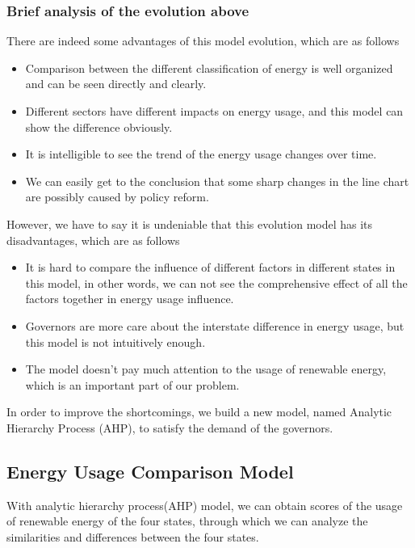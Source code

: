 \documentclass[a4paper,11pt]{article}
\begin{document}
\subsubsection{Brief analysis of the evolution above}
\par There are indeed some advantages of this model evolution, which are as follows
\begin{itemize}
    \item Comparison between the different classification of energy is well organized and can be seen directly and clearly.
    \item Different sectors have different impacts on energy usage, and this model can show the difference obviously.
    \item It is intelligible to see the trend of the energy usage changes over time.
    \item We can easily get to the conclusion that some sharp changes in the line chart are possibly caused by policy reform.  
\end{itemize}
\par However, we have to say it is undeniable that this evolution model has its disadvantages, which are as follows
\begin{itemize}
    \item It is hard to compare the influence of different factors in different states in this model, in other words, we can not see the comprehensive effect of all the factors together in energy usage influence.
    \item Governors are more care about the interstate difference in energy usage, but this model is not intuitively enough.
    \item The model doesn't pay much attention to the usage of renewable energy, which is an important part of our problem.
\end{itemize}
\par In order to improve the shortcomings, we build a new model, named Analytic Hierarchy Process (AHP), to satisfy the demand of the governors.


\subsection{Energy Usage Comparison Model}

\par With analytic hierarchy process(AHP) model, we can obtain scores of the usage of renewable energy of the four states, through which we can analyze the similarities and differences between the four states. 
\end{document}
